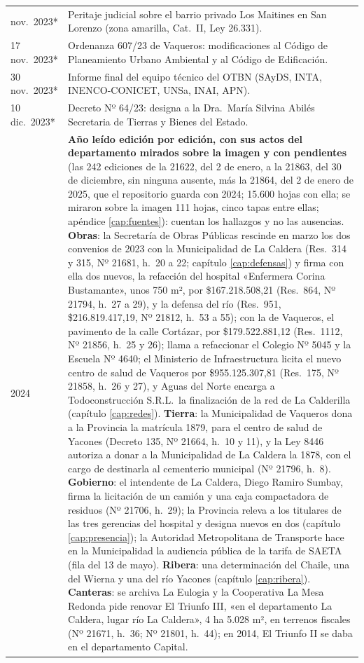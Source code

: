 \begin{longtable}{@{}p{2.7cm}p{10.3cm}@{}}
nov.\ 2023* & Peritaje judicial sobre el barrio privado Los Maitines en San Lorenzo (zona amarilla, Cat.\ II, Ley 26.331). \\
17 nov.\ 2023* & Ordenanza 607/23 de Vaqueros: modificaciones al Código de Planeamiento Urbano Ambiental y al Código de Edificación. \\
30 nov.\ 2023* & Informe final del equipo técnico del OTBN (SAyDS, INTA, INENCO-CONICET, UNSa, INAI, APN). \\
10 dic.\ 2023* & Decreto Nº 64/23: designa a la Dra.\ María Silvina Abilés Secretaria de Tierras y Bienes del Estado. \\
2024 & \textbf{Año leído edición por edición, con sus actos del departamento mirados sobre la imagen y con pendientes} (las 242 ediciones de la 21622, del 2 de enero, a la 21863, del 30 de diciembre, sin ninguna ausente, más la 21864, del 2 de enero de 2025, que el repositorio guarda con 2024; 15.600 hojas con ella; se miraron sobre la imagen 111 hojas, cinco tapas entre ellas; apéndice \ref{cap:fuentes}): cuentan los hallazgos y no las ausencias. \textbf{Obras}: la Secretaría de Obras Públicas rescinde en marzo los dos convenios de 2023 con la Municipalidad de La Caldera (Res.\ 314 y 315, Nº 21681, h.\ 20 a 22; capítulo \ref{cap:defensas}) y firma con ella dos nuevos, la refacción del hospital «Enfermera Corina Bustamante», unos 750 m², por \$167.218.508,21 (Res.\ 864, Nº 21794, h.\ 27 a 29), y la defensa del río (Res.\ 951, \$216.819.417,19, Nº 21812, h.\ 53 a 55); con la de Vaqueros, el pavimento de la calle Cortázar, por \$179.522.881,12 (Res.\ 1112, Nº 21856, h.\ 25 y 26); llama a refaccionar el Colegio Nº 5045 y la Escuela Nº 4640; el Ministerio de Infraestructura licita el nuevo centro de salud de Vaqueros por \$955.125.307,81 (Res.\ 175, Nº 21858, h.\ 26 y 27), y Aguas del Norte encarga a Todoconstrucción S.R.L.\ la finalización de la red de La Calderilla (capítulo \ref{cap:redes}). \textbf{Tierra}: la Municipalidad de Vaqueros dona a la Provincia la matrícula 1879, para el centro de salud de Yacones (Decreto 135, Nº 21664, h.\ 10 y 11), y la Ley 8446 autoriza a donar a la Municipalidad de La Caldera la 1878, con el cargo de destinarla al cementerio municipal (Nº 21796, h.\ 8). \textbf{Gobierno}: el intendente de La Caldera, Diego Ramiro Sumbay, firma la licitación de un camión y una caja compactadora de residuos (Nº 21706, h.\ 29); la Provincia releva a los titulares de las tres gerencias del hospital y designa nuevos en dos (capítulo \ref{cap:presencia}); la Autoridad Metropolitana de Transporte hace en la Municipalidad la audiencia pública de la tarifa de SAETA (fila del 13 de mayo). \textbf{Ribera}: una determinación del Chaile, una del Wierna y una del río Yacones (capítulo \ref{cap:ribera}). \textbf{Canteras}: se archiva La Eulogia y la Cooperativa La Mesa Redonda pide renovar El Triunfo III, «en el departamento La Caldera, lugar río La Caldera», 4 ha 5.028 m², en terrenos fiscales (Nº 21671, h.\ 36; Nº 21801, h.\ 44); en 2014, El Triunfo II se daba en el departamento Capital. \\

\end{longtable}
